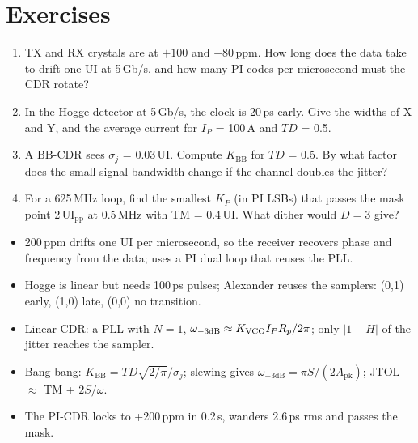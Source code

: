 \section{Exercises}\label{sec:ch13-ex}

\begin{enumerate}[label=\textbf{13.\arabic*},leftmargin=2.4em]
  \item TX and RX crystals are at $+100$ and $-80$\,ppm. How long does the data take to drift one UI at 5\,Gb/s, and how many PI codes per microsecond must the CDR rotate?
  \item In the Hogge detector at 5\,Gb/s, the clock is 20\,ps early. Give the widths of X and Y, and the average current for $I_P$ = 100\,\textmu{}A and $TD$ = 0.5.
  \item A BB-CDR sees $\sigma_j$ = 0.03\,UI. Compute $K_\mathrm{BB}$ for $TD$ = 0.5. By what factor does the small-signal bandwidth change if the channel doubles the jitter?
  \item For a 625\,MHz loop, find the smallest $K_P$ (in PI LSBs) that passes the mask point 2\,UI$_\mathrm{pp}$ at 0.5\,MHz with TM = 0.4\,UI. What dither would $D = 3$ give?
\end{enumerate}

\begin{takeaways}
\begin{itemize}
  \item 200\,ppm drifts one UI per microsecond, so the receiver recovers phase and frequency from the data; \OS{} uses a PI dual loop that reuses the PLL.
  \item Hogge is linear but needs 100\,ps pulses; Alexander reuses the samplers: (0,1) early, (1,0) late, (0,0) no transition.
  \item Linear CDR: a PLL with $N = 1$, $\omega_{-3\mathrm{dB}} \approx K_\mathrm{VCO} I_P R_p/2\pi$; only $|1-H|$ of the jitter reaches the sampler.
  \item Bang-bang: $K_\mathrm{BB} = TD\sqrt{2/\pi}/\sigma_j$; slewing gives $\omega_{-3\mathrm{dB}} = \pi S/(2A_\mathrm{pk})$; JTOL $\approx$ TM + $2S/\omega$.
  \item The \OS{} PI-CDR locks to +200\,ppm in 0.2\,\textmu{}s, wanders 2.6\,ps rms and passes the mask.
\end{itemize}
\end{takeaways}
